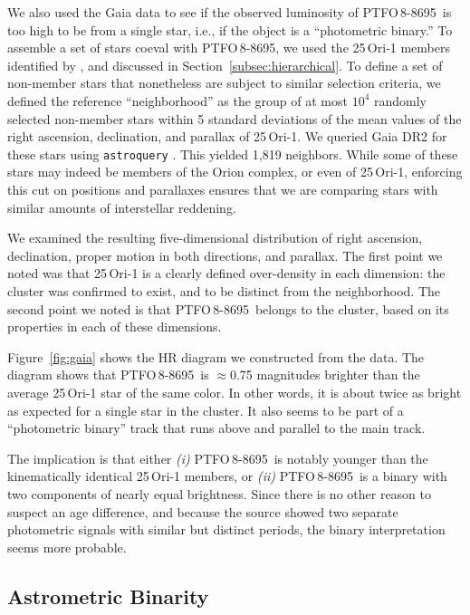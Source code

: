 \documentclass[12pt,twocolumn,tighten,trackchanges]{aastex62}
\newcommand{\ptfo}{PTFO$\,$8-8695}
\begin{document}
We also used the Gaia data to see if the observed luminosity of \ptfo\
is too high to be from a single star, i.e., if the object is a
``photometric binary.'' To assemble a set of stars coeval with \ptfo,
we used the 25$\,$Ori-1 members identified by
\citet{kounkel_apogee2_2018}, and discussed in
Section~\ref{subsec:hierarchical}.  To define a set of non-member
stars that nonetheless are subject to similar selection criteria, we
defined the reference ``neighborhood'' as the group of at most $10^4$
randomly selected non-member stars within 5 standard deviations of the
mean values of the right ascension, declination, and parallax of
25$\,$Ori-1.  We queried Gaia DR2 for these stars using
\texttt{astroquery} \citep{astroquery_2018}.  This yielded 1{,}819
neighbors.  While some of these stars may indeed be members of the
Orion complex, or even of 25$\,$Ori-1, enforcing this cut on positions
and parallaxes ensures that we are comparing stars with similar
amounts of interstellar reddening.

We examined the resulting five-dimensional distribution of right
ascension, declination, proper motion in both directions, and
parallax.  The first point we noted was that 25$\,$Ori-1 is a clearly
defined over-density in each dimension: the cluster was confirmed to
exist, and to be distinct from the neighborhood.  The second point we
noted is that \ptfo\ belongs to the cluster, based on its properties
in each of these dimensions.

Figure~\ref{fig:gaia} shows the HR diagram we constructed from the
data.  The diagram shows that \ptfo\ is $\approx$0.75 magnitudes
brighter than the average 25$\,$Ori-1 star of the same color.  In
other words, it is about twice as bright as expected for a single star
in the cluster.  It also seems to be part of a ``photometric binary''
track that runs above and parallel to the main track.

The implication is that either {\it (i)} \ptfo\ is notably younger
than the kinematically identical 25$\,$Ori-1 members, or {\it (ii)}
\ptfo\ is a binary with two components of nearly equal brightness.
Since there is no other reason to suspect an age difference, and
because the source showed two separate photometric signals with
similar but distinct periods, the binary interpretation seems more
probable.

\subsection{Astrometric Binarity}
\end{document}
